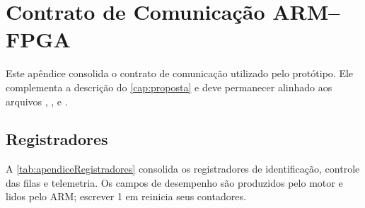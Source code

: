 
\chapter{Contrato de Comunicação ARM--FPGA}\label{cap:apendicea}

Este apêndice consolida o contrato de comunicação utilizado pelo protótipo. Ele complementa a descrição do \autoref{cap:proposta} e deve permanecer alinhado aos arquivos , ,  e .

\section{Registradores}\label{sec:apendiceRegistradores}

A \autoref{tab:apendiceRegistradores} consolida os registradores de identificação, controle das filas e telemetria. Os campos de desempenho são produzidos pelo motor e lidos pelo ARM; escrever 1 em  reinicia seus contadores.

